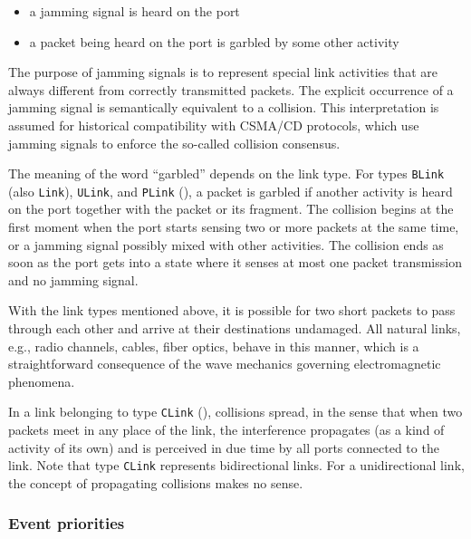 \begin{itemize}
\item
a jamming signal is heard on the port
\item
a packet being heard on the port is garbled by some other activity
\end{itemize}

The purpose of jamming signals is to represent special link activities that
are always different from correctly transmitted packets.
The explicit occurrence of a jamming signal is semantically
equivalent to a collision.
This interpretation is assumed for historical
compatibility with CSMA/CD protocols,
which use jamming signals to enforce the so-called collision consensus.

The meaning of the word ``garbled'' depends on the link type.
For types {\tt BLink} (also {\tt Link}),
{\tt ULink}, and {\tt PLink} (), a packet is garbled
if another activity is heard on the port together with the packet or its
fragment.
The collision begins at the first moment when the port starts sensing two
or more packets at the same time, or a jamming signal possibly mixed
with other activities.
The collision ends as soon as the port gets into a state where it
senses at most one packet transmission and no jamming signal.

With the link types mentioned above, it is possible for two short packets
to pass through each other and arrive at their destinations undamaged.
All natural links, e.g., radio channels, cables, fiber optics, behave in
this manner, which is a straightforward consequence of the
wave mechanics governing electromagnetic phenomena.

In a link belonging to type {\tt CLink} (),
collisions spread, in the sense that when two
packets meet in any place of the link, the interference propagates
(as a kind of activity of its own) and is perceived in due time by all
ports connected to the link.
Note that type {\tt CLink} represents bidirectional links.
For a unidirectional link, the concept of propagating collisions makes no
sense.

\subsubsection{Event priorities}
\label{rm_po_wr_ep}

